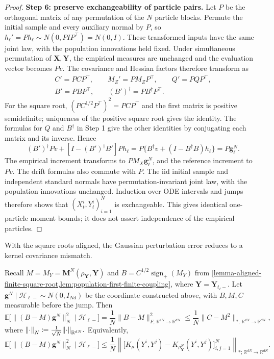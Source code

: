 \begin{proof}
\par\noindent\textbf{Step 6: preserve exchangeability of particle pairs.}
Let $P$ be the orthogonal matrix of any permutation of the $N$ particle
blocks. Permute the initial sample and every auxiliary normal by $P$,
so $h_\ell'=Ph_\ell\sim N(0,PIP^\top)=N(0,I)$. These transformed
inputs have the same joint law, with the population innovations held fixed. Under simultaneous permutation of $\mathbf X,\mathbf Y$, the
empirical measures are unchanged and the evaluation vector becomes $Pv$.
The covariance and Hessian factors therefore transform as
\[
\begin{gathered}
 C'=PCP^\top,\qquad M_Z'=PM_ZP^\top,\qquad Q'=PQP^\top,\\
 B'=PBP^\top,\qquad (B')^\dagger=PB^\dagger P^\top.
\end{gathered}
\]
For the square root, $(PC^{1/2}P^\top)^2=PCP^\top$ and the first matrix
is positive semidefinite; uniqueness of the positive square root gives the identity.
The formulas for $Q$ and $B^\dagger$ in Step 1 give the other identities
by conjugating each matrix and its inverse. Hence
\[
 (B')^\dagger Pv+[I-(B')^\dagger B']Ph_\ell
 =P\{B^\dagger v+(I-B^\dagger B)h_\ell\}
 =P\mathbf g_\ell^N.
\]
The empirical increment transforms to $PM_X\mathbf g_\ell^N$, and the
reference increment to $Pv$. The drift formulas also commute with $P$.
The iid initial sample and independent standard normals have
permutation-invariant joint law, with the population innovations unchanged.
Induction over ODE intervals and jumps therefore shows that
$(X_t^i,Y_t^i)_{i=1}^N$ is exchangeable. This gives identical one-particle
moment bounds; it does not assert independence of the empirical particles.
\end{proof}

With the square roots aligned, the Gaussian perturbation error reduces to a
kernel covariance mismatch.

\begin{lemma}
\label{lemma-gaussian-error-to-kernel-mismatch}
Recall $M=M_Y=\mathbf M^N(\rho_{\mathbf Y},\mathbf Y)$ and
$B=C^{1/2}\operatorname{sign}_+(M_Y)$ from
\cref{lemma-aligned-finite-square-root,lem:population-first-finite-coupling},
where $\mathbf Y=\mathbf Y_{t_\ell-}$. Let $\mathbf g^N\mid\mathcal H_{\ell-}\sim N(0,I_{Nd})$ be the coordinate constructed above, with $B,M,C$ measurable before the jump.
Then
\[
\mathbb E\bigl[\|(B-M)\mathbf g^N\|_N^2\mid\mathcal H_{\ell-}\bigr]
=
\frac1N\|B-M\|_{F;\,\mathbb R^{dN}\to\mathbb R^{dN}}^2
\le
\frac1N\|C-M^2\|_{*;\,\mathbb R^{dN}\to\mathbb R^{dN}},
\]
where $\norm{\cdot}_N \coloneq \frac{1}{\sqrt{N}}\norm{\cdot}_{\mathbb{R}^{dN}}.$
Equivalently,
\[
\mathbb E\bigl[\|(B-M)\mathbf g^N\|_N^2\mid\mathcal H_{\ell-}\bigr]
\le
\frac1N
\left\|
\bigl[
K_\mu(Y^i,Y^j)-K_{\rho_{\mathbf Y}^N}(Y^i,Y^j)
\bigr]_{i,j=1}^N
\right\|_{*;\,\mathbb R^{dN}\to\mathbb R^{dN}}.
\]
\end{lemma}

